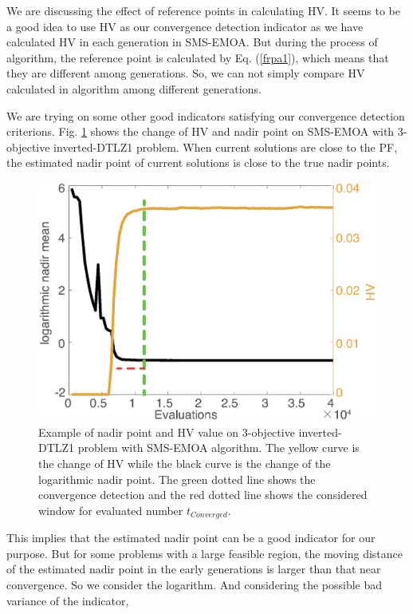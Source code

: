 \documentclass[conference]{IEEEtran}
\begin{document}
We are discussing the effect of reference points in calculating HV. It seems to be a good
idea to use HV as our convergence detection indicator as we have calculated 
HV in each generation in SMS-EMOA. 
But during the process of algorithm, the reference point is calculated by Eq. (\ref{frpa1}), 
which means that they are different among generations. 
So, we can not simply compare HV calculated in algorithm among different generations. 

We are trying on some other good indicators satisfying our convergence detection criterions. 
Fig. \ref{wcd1} shows the change of HV and nadir point on SMS-EMOA  
with 3-objective inverted-DTLZ1 problem.
When current solutions are close to the PF, the estimated nadir point of current solutions is close 
to the true nadir points. 
\begin{figure}[!t]
  \centering
    \includegraphics[width=\columnwidth]{FVEMOA_IDTLZ1_M3_nadir_1}
  \caption{Example of nadir point and HV value on 3-objective inverted-DTLZ1 problem
  with SMS-EMOA algorithm.
  The yellow curve is the change of HV 
  while the black curve is the change of the logarithmic nadir point.
  The green dotted line shows the convergence detection 
  and the red dotted line shows the considered window for evaluated number $t_{Converged}$. 
  }
  \label{wcd1}
\end{figure}
This implies that the estimated nadir point can be a good indicator for our purpose. 
But for some problems with a large feasible region, 
the moving distance of the estimated nadir point in the early generations is larger than that near convergence.
So we consider the logarithm. And considering the possible bad variance of the indicator, 
\end{document}
